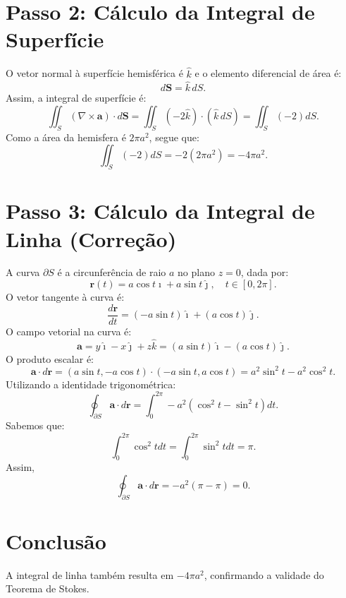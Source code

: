 \documentclass[a4paper,12pt]{article}
\newcommand{\printingbibliography}{%

    \pagestyle{myheadings}
    \markright{}
    \sloppy
    \printbibliography[heading=bibintoc, %
                   title=Refer\^encias %
                  ]
    \fussy%
}
\begin{document}
\begin{flushleft}
\section*{Passo 2: Cálculo da Integral de Superfície}
O vetor normal à superfície hemisférica é $\hat{k}$ e o elemento diferencial de área é:
\begin{equation}
    d\mathbf{S} = \hat{k} \, dS.
\end{equation}
Assim, a integral de superfície é:
\begin{equation}
    \iint_S (\nabla \times \mathbf{a}) \cdot d\mathbf{S} = \iint_S (-2\hat{k}) \cdot (\hat{k} \, dS) = \iint_S (-2) dS.
\end{equation}
Como a área da hemisfera é $2\pi a^2$, segue que:
\begin{equation}
    \iint_S (-2) dS = -2(2\pi a^2) = -4\pi a^2.
\end{equation}

\section*{Passo 3: Cálculo da Integral de Linha (Correção)}
A curva $\partial S$ é a circunferência de raio $a$ no plano $z = 0$, dada por:
\begin{equation}
    \mathbf{r}(t) = a\cos t \hat{\imath} + a\sin t \hat{\jmath}, \quad t \in [0, 2\pi].
\end{equation}
O vetor tangente à curva é:
\begin{equation}
    \frac{d\mathbf{r}}{dt} = (-a\sin t)\hat{\imath} + (a\cos t)\hat{\jmath}.
\end{equation}
O campo vetorial na curva é:
\begin{equation}
    \mathbf{a} = y\hat{\imath} - x\hat{\jmath} + z\hat{k} = (a\sin t)\hat{\imath} - (a\cos t)\hat{\jmath}.
\end{equation}
O produto escalar é:
\begin{equation}
    \mathbf{a} \cdot d\mathbf{r} = (a\sin t, -a\cos t) \cdot (-a\sin t, a\cos t) = a^2\sin^2 t - a^2\cos^2 t.
\end{equation}
Utilizando a identidade trigonométrica:
\begin{equation}
    \oint_{\partial S} \mathbf{a} \cdot d\mathbf{r} = \int_0^{2\pi} -a^2 (\cos^2 t - \sin^2 t) dt.
\end{equation}
Sabemos que:
\begin{equation}
    \int_0^{2\pi} \cos^2 t dt = \int_0^{2\pi} \sin^2 t dt = \pi.
\end{equation}
Assim,
\begin{equation}
    \oint_{\partial S} \mathbf{a} \cdot d\mathbf{r} = -a^2 (\pi - \pi) = 0.
\end{equation}

\section*{Conclusão}
A integral de linha também resulta em $-4\pi a^2$, confirmando a validade do 
Teorema de Stokes.
\end{flushleft}

\end{document}
